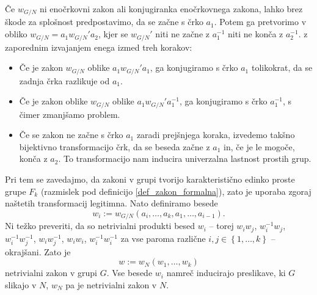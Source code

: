 \begin{dokaz}
        Če $w_{G / N}$ ni enočrkovni zakon ali konjugiranka enočrkovnega zakona, lahko brez škode za splošnost predpostavimo, da se začne s črko $a_1$. Potem ga pretvorimo v obliko $w_{ G / N} = a_1 w_{ G / N}' a_2$, kjer se $w_{ G / N}'$ niti ne začne z $a_1^{-1}$ niti ne konča z $a_2^{-1}$.
        z zaporednim izvajanjem enega izmed treh korakov: \begin{itemize}
            \item Če je zakon $w_{ G / N}$ oblike $a_1 w_{ G / N}' a_1$, ga konjugiramo s črko $a_1$ tolikokrat, da se zadnja črka razlikuje od $a_1$.
            \item Če je zakon oblike $w_{ G / N}$ oblike $a_1 w_{ G / N}' a_1^{-1}$, ga konjugiramo s črko $a_1^{-1}$, s čimer zmanjšamo problem.
            \item Če se zakon ne začne s črko $a_1$ zaradi prejšnjega koraka, izvedemo takšno bijektivno transformacijo črk, da se beseda začne z $a_1$ in, če je le mogoče, konča z $a_2$. To transformacijo nam inducira univerzalna lastnost prostih grup. 
        \end{itemize}
        Pri tem se zavedajmo, da zakoni v grupi tvorijo karakteristično edinko proste grupe $F_k$ (razmislek pod definicijo \ref{def_zakon_formalna}), zato je uporaba zgoraj naštetih transformacij legitimna. 
        Nato definiramo besede \begin{equation*}
   w_i := w_{ G / N}(a_{i}, \ldots, a_{k}, a_1, \ldots, a_{i - 1}).
   \end{equation*}  
   Ni težko preveriti, da so netrivialni produkti besed $w_i$ -- torej $w_{i} w_{j}$, $w_{i}^{-1} w_{j}$, \\ 
   $w_{i}^{-1} w_{j}^{-1}$,  $w_{i} w_{j}^{-1}$, $w_{i} w_{i}$, $w_{i}^{-1} w_{i}^{-1}$ za vse paroma različne $i,j \in \left\{ 1, \ldots, k \right\}$ -- okrajšani.
   Zato je \begin{equation*}
    w := w_N (w_1, \ldots, w_{k})
    \end{equation*}  
    netrivialni zakon v grupi $G$. Vse besede $w_{i}$ namreč inducirajo preslikave, ki $G$ slikajo v $N$, $w_N$ pa je netrivialni zakon v $N$.       
\end{dokaz}

